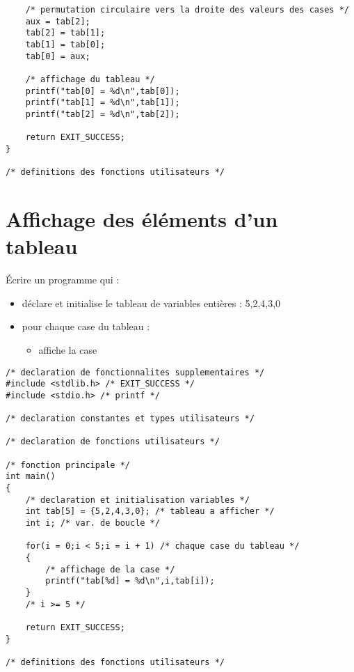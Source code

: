 \begin{enumerate}
\begin{correction}
\begin{verbatim}
    /* permutation circulaire vers la droite des valeurs des cases */
    aux = tab[2];
    tab[2] = tab[1];
    tab[1] = tab[0];
    tab[0] = aux;

    /* affichage du tableau */
    printf("tab[0] = %d\n",tab[0]);
    printf("tab[1] = %d\n",tab[1]);
    printf("tab[2] = %d\n",tab[2]);

    return EXIT_SUCCESS;
}

/* definitions des fonctions utilisateurs */

\end{verbatim}
  \end{correction}
\end{enumerate}

\section{Affichage des éléments d'un tableau}

Écrire un programme qui :
\begin{itemize}
\item déclare et initialise le tableau de variables entières : 5,2,4,3,0
\item pour chaque case du tableau :
  \begin{itemize}
  \item affiche la case
  \end{itemize}
\end{itemize}

\begin{correction}
\begin{verbatim}
/* declaration de fonctionnalites supplementaires */
#include <stdlib.h> /* EXIT_SUCCESS */
#include <stdio.h> /* printf */

/* declaration constantes et types utilisateurs */

/* declaration de fonctions utilisateurs */

/* fonction principale */
int main()
{
    /* declaration et initialisation variables */
    int tab[5] = {5,2,4,3,0}; /* tableau a afficher */
    int i; /* var. de boucle */

    for(i = 0;i < 5;i = i + 1) /* chaque case du tableau */
    {
        /* affichage de la case */
        printf("tab[%d] = %d\n",i,tab[i]);
    }
    /* i >= 5 */

    return EXIT_SUCCESS;
}

/* definitions des fonctions utilisateurs */

\end{verbatim}
\end{correction}

